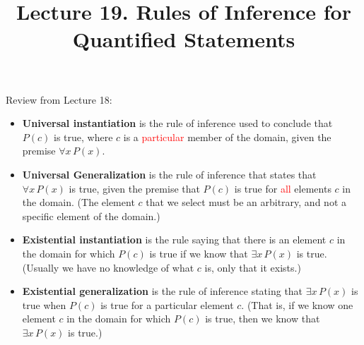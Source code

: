\documentclass[aspectratio=169]{beamer}
\title{Lecture 19. Rules of Inference for Quantified Statements}
\date{ }
\providecommand{\Red}[1]{\textcolor{red}{#1}}
\begin{document}
\frame[plain]{\titlepage}

\begin{frame}[plain]{}

Review from Lecture 18:

  \begin{itemize}
        \item {\bf Universal instantiation} is the rule of inference used to conclude that $P(c)$ is true, where $c$
               is a \Red{particular} member of the domain, given the premise $\forall x\, P(x)$.
        \item  {\bf Universal Generalization} is the rule of inference that states that $\forall x\, P(x)$ is true, given the
      premise that $P(c)$ is true for \Red{all} elements $c$ in the domain.
       (The element $c$ that we select must be an arbitrary, and not a specific element of
the domain.)
   \item  {\bf Existential instantiation} is the rule saying  that there is an element $c$ in
           the domain for which $P(c)$ is true if we know that $\exists x\, P(x)$ is true. 
          (Usually we have no knowledge of what $c$ is, only that it exists.)
         \item {\bf Existential generalization} is the rule of inference stating that $\exists x\, P(x)$ is
         true when $P(c)$ is true for a particular element $c$. 
        (That is, if we know one element $c$ in
               the domain for which $P(c)$ is true, then we know that $ \exists x\, P(x)$ is true.)
         
     \end{itemize}
  
\end{frame}
\end{document}
